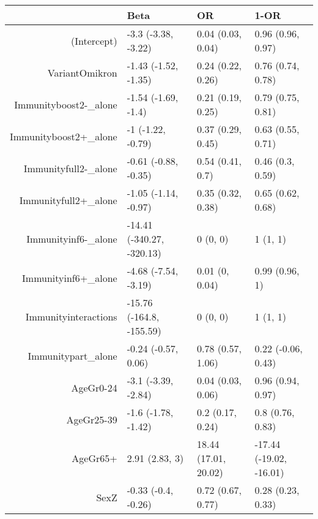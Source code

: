 \begin{table}[ht]
\centering
\begin{tabular}{rlll}
  \hline
 & Beta & OR & 1-OR \\ 
  \hline
(Intercept) & -3.3 (-3.38, -3.22) & 0.04 (0.03, 0.04) & 0.96 (0.96, 0.97) \\ 
  VariantOmikron & -1.43 (-1.52, -1.35) & 0.24 (0.22, 0.26) & 0.76 (0.74, 0.78) \\ 
  Immunityboost2-\_alone & -1.54 (-1.69, -1.4) & 0.21 (0.19, 0.25) & 0.79 (0.75, 0.81) \\ 
  Immunityboost2+\_alone & -1 (-1.22, -0.79) & 0.37 (0.29, 0.45) & 0.63 (0.55, 0.71) \\ 
  Immunityfull2-\_alone & -0.61 (-0.88, -0.35) & 0.54 (0.41, 0.7) & 0.46 (0.3, 0.59) \\ 
  Immunityfull2+\_alone & -1.05 (-1.14, -0.97) & 0.35 (0.32, 0.38) & 0.65 (0.62, 0.68) \\ 
  Immunityinf6-\_alone & -14.41 (-340.27, -320.13) & 0 (0, 0) & 1 (1, 1) \\ 
  Immunityinf6+\_alone & -4.68 (-7.54, -3.19) & 0.01 (0, 0.04) & 0.99 (0.96, 1) \\ 
  Immunityinteractions & -15.76 (-164.8, -155.59) & 0 (0, 0) & 1 (1, 1) \\ 
  Immunitypart\_alone & -0.24 (-0.57, 0.06) & 0.78 (0.57, 1.06) & 0.22 (-0.06, 0.43) \\ 
  AgeGr0-24 & -3.1 (-3.39, -2.84) & 0.04 (0.03, 0.06) & 0.96 (0.94, 0.97) \\ 
  AgeGr25-39 & -1.6 (-1.78, -1.42) & 0.2 (0.17, 0.24) & 0.8 (0.76, 0.83) \\ 
  AgeGr65+ & 2.91 (2.83, 3) & 18.44 (17.01, 20.02) & -17.44 (-19.02, -16.01) \\ 
  SexZ & -0.33 (-0.4, -0.26) & 0.72 (0.67, 0.77) & 0.28 (0.23, 0.33) \\ 
   \hline
\end{tabular}
\end{table}
